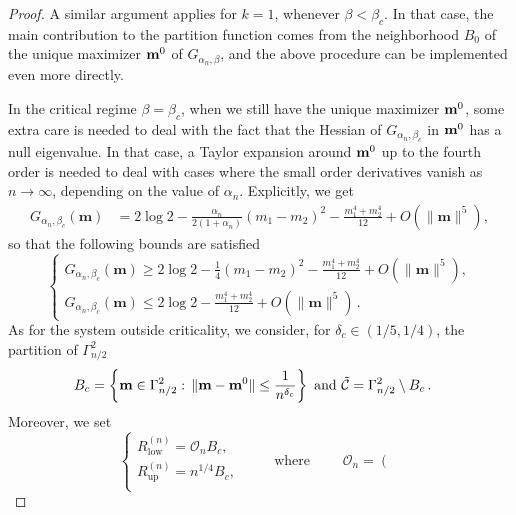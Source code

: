 \documentclass[11pt,oneside]{amsart}
\numberwithin{equation}{section}  %
\theoremstyle{plain}
\theoremstyle{remark}
\def \bm {{\bf m}}
\begin{document}
\begin{proof}
A similar argument applies for $k=1$, whenever $\beta<\beta_c$.
In that case, the main contribution to the partition function comes 
from the neighborhood $B_0$ of the unique maximizer $\bm^0$ of $G_{\alpha_n,\beta}$, and the above procedure can be implemented even more directly. %

In the critical regime $\beta=\beta_c$, when we still have the unique maximizer $\bm^0$, some extra care is needed to deal with the fact that
the Hessian of $G_{\alpha_n,\beta_c}$ in $\bm^0$  has a null eigenvalue.
In that case, a Taylor expansion around $\bm^0$ up to the fourth order is needed to deal with cases where the small order derivatives vanish as $n\to\infty$, depending on the value of $\alpha_n$. 
Explicitly, we get
\begin{align}\label{eq:Exp-G-Crit}
   G_{\alpha_n,\beta_c}(\mathbf{m})
&= 2\log 2
-\frac{\alpha_n}{2(1+\alpha_n)}(m_1-m_2)^2
- \frac{m_1^4+m_2^4}{12}
+ O(\|\mathbf{m}\|^5),
\end{align}
%
so that the following bounds are satisfied
\begin{equation}\label{bound-G-crit}
\left\{
\begin{array}{l}
G_{\alpha_n,\beta_c}(\mathbf{m}) 
\ge 2\log 2 -\frac{1}{4}(m_1-m_2)^2 - \frac{m_1^4+m_2^4}{12}
+ O(\|\mathbf{m}\|^5),\\[0.3cm]
G_{\alpha_n,\beta_c}(\mathbf{m}) 
\le 2\log 2 - \frac{m_1^4+m_2^4}{12}
+ O(\|\mathbf{m}\|^5)\,.
\end{array}
\right.
\end{equation}
As for the system outside criticality, we consider, for  $\delta_c \in (1/5, 1/4)$,
the partition of $\Gamma_{n/2}^2$
\begin{equation}\label{def:DNtilde}
\begin{split}
& B_c= \left \{ \bm \in \Gamma_{n/2}^2: \, \|\bm-\bm^0\| \leq \frac{1}{n^{\delta_c}} \right \} \,\, \text{and}
    \,\, \mathcal{\tilde{C}}=\Gamma_{n/2}^2 \setminus B_c \,. 
    \end{split}
\end{equation}
Moreover, we set
\begin{equation}
 \left\{\begin{array}{l}
 R_{\text{low}}^{(n)} =
\mathcal{O}_n B_c,
 \\[0.5cm]
 R_{\text{up}}^{(n)} =
n^{1/4} B_c,
\\
\end{array}
\right.
\qquad
\mbox{ where }
\qquad
\mathcal{O}_n=
\left(
\begin{array}{ll}

\end{array}
\end{equation}
\end{proof}
\end{document}
